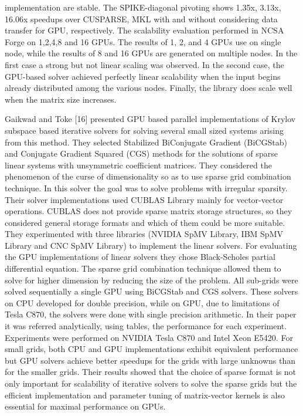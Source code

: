 implementation are stable. The SPIKE-diagonal pivoting shows 1.35x, 3.13x, 16.06x speedups over CUSPARSE, MKL with and without considering data transfer for GPU, respectively. The scalability evaluation performed in NCSA Forge on 1,2,4,8 and 16 GPUs. The results of 1, 2, and 4 GPUs use on single node, while the results of 8 and 16 GPUs are generated on multiple nodes. In the first case a strong but not linear scaling was observed. In the second case, the GPU-based solver achieved perfectly linear scalability when the input begins already distributed among the various nodes. Finally, the library does scale well when the matrix size increases.

Gaikwad and Toke [16] presented GPU based parallel implementations of Krylov subspace based iterative solvers for solving several small sized systems arising from this method. They selected Stabilized BiConjugate Gradient (BiCGStab) and Conjugate Gradient Squared (CGS) methods for the solutions of sparse linear systems with unsymmetric coefficient matrices. They considered the phenomenon of the curse of dimensionality so as to use sparse grid combination technique. In this solver the goal was to solve problems with irregular sparsity. Their solver implementations used CUBLAS Library mainly for vector-vector operations. CUBLAS does not provide sparse matrix storage structures, so they considered general storage formats and which of them could be more suitable. They experimented with three libraries (NVIDIA SpMV Library, IBM SpMV Library and CNC SpMV Library) to implement the linear solvers. For evaluating the GPU implementations of linear solvers they chose Black-Scholes partial differential equation. The sparse grid combination technique allowed them to solve for higher dimension by reducing the size of the problem. All sub-grids were solved sequentially a single GPU using BiCGStab and CGS solvers. These solvers on CPU developed for double precision, while on GPU, due to limitations of Tesla C870, the solvers were done with single precision arithmetic. In their paper it was referred analytically, using tables, the performance for each experiment. Experiments were performed on NVIDIA Tesla C870 and Intel Xeon E5420. For small grids, both CPU and GPU implementations exhibit equivalent performance but GPU solvers achieve better speedups for the grids with large unknowns than for the smaller grids. Their results showed that the choice of sparse format is not only important for scalability of iterative solvers to solve the sparse grids but the efficient implementation and parameter tuning of matrix-vector kernels is also essential for maximal performance on GPUs.
